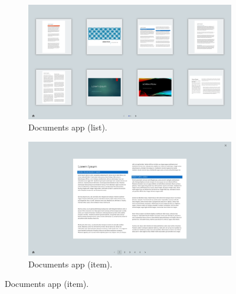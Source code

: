 \begin{figure}[p]
    \begin{subfigure}{.47\textwidth}
        \centering
        \includegraphics[width=.96\linewidth]{Figures/LUI/UI/documents-list.pdf} 
        \vspace{-5pt}
        \captionsetup{width=.9\linewidth}
        \caption{Documents app (list).}
        \label{fig:lui:screenshots:documents-list}
    \end{subfigure}
    \begin{subfigure}{.47\textwidth}
        \centering
        \includegraphics[width=.96\linewidth]{Figures/LUI/UI/documents-fullscreen.pdf}  
        \vspace{-5pt}
        \captionsetup{width=.9\linewidth}
        \caption{Documents app (item).}
        \label{fig:lui:screenshots:documents-fullscreen}
    \end{subfigure}


\end{figure}
